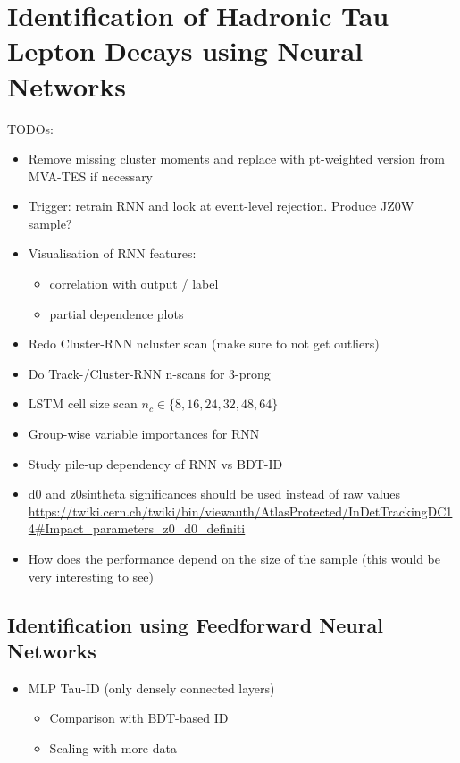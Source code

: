 \chapter{Identification of Hadronic Tau Lepton Decays using Neural Networks}
\label{sec:rnn}


TODOs:
\begin{itemize}
\item Remove missing cluster moments and replace with pt-weighted version from
  MVA-TES if necessary
\item Trigger: retrain RNN and look at event-level rejection. Produce JZ0W
  sample?
\item Visualisation of RNN features:
  \begin{itemize}
  \item correlation with output / label
  \item partial dependence plots
  \end{itemize}
\item Redo Cluster-RNN ncluster scan (make sure to not get outliers)
\item Do Track-/Cluster-RNN n-scans for 3-prong
\item LSTM cell size scan $n_c \in \{8, 16, 24, 32, 48, 64\}$
\item Group-wise variable importances for RNN
\item Study pile-up dependency of RNN vs BDT-ID
\item d0 and z0sintheta significances should be used instead of raw values
  \url{https://twiki.cern.ch/twiki/bin/viewauth/AtlasProtected/InDetTrackingDC14#Impact_parameters_z0_d0_definiti}
\item How does the performance depend on the size of the sample (this
  would be very interesting to see)
\end{itemize}

\section{Identification using Feedforward Neural Networks}
\label{sec:ffnn_id}

\begin{itemize}
\item MLP Tau-ID (only densely connected layers)
  \begin{itemize}
  \item Comparison with BDT-based ID
  \item Scaling with more data
  \end{itemize}
\end{itemize}

